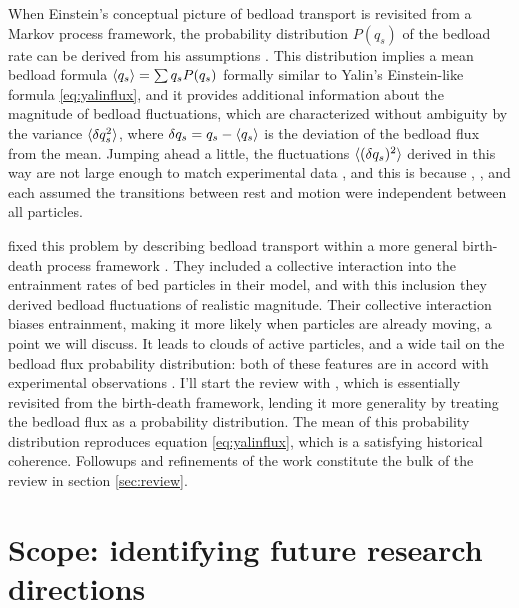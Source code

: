 When Einstein's conceptual picture of bedload transport is revisited from a Markov process framework, the probability distribution $P(q_s)$ of the bedload rate can be derived from his assumptions \citep{Ancey2006}. 
This distribution implies a mean bedload formula $\langle q_s \rangle = \sum q_s P(q_s)$ formally similar to Yalin's Einstein-like formula \ref{eq:yalinflux}, and it provides additional information about the magnitude of bedload fluctuations, which are characterized without ambiguity by the variance $\langle \delta q_s^2 \rangle$, where $\delta q_s = q_s - \langle q_s \rangle$ is the deviation of the bedload flux from the mean.
Jumping ahead a little, the fluctuations $\langle (\delta q_s)^2 \rangle$ derived in this way are not large enough to match experimental data \citep{Ancey2006}, and this is because \citet{Einstein1950}, \citet{Yalin1972}, and \citet{Ancey2006} each assumed the transitions between rest and motion were independent between all particles.

\citet{Ancey2008} fixed this problem by describing bedload transport within a more general birth-death process framework \citep{Cox1965}. 
They included a collective interaction into the entrainment rates of bed particles in their model, and with this inclusion they derived bedload fluctuations of realistic magnitude. 
Their collective interaction biases entrainment, making it more likely when particles are already moving, a point we will discuss.  
It leads to clouds of active particles, and a wide tail on the bedload flux probability distribution: both of these features are in accord with experimental observations \citep{Drake1988, Ancey2006, Ancey2008}. 
I'll start the review with \citet{Ancey2006}, which is essentially \citet{Einstein1950} revisited from the birth-death framework, lending it more generality by treating the bedload flux as a probability distribution.   
The mean of this probability distribution reproduces equation \ref{eq:yalinflux}, which is a satisfying historical coherence. 
Followups and refinements of the \citet{Ancey2006} work constitute the bulk of the review in section \ref{sec:review}. 

\section{Scope: identifying future research directions}
\label{sec:scope}







